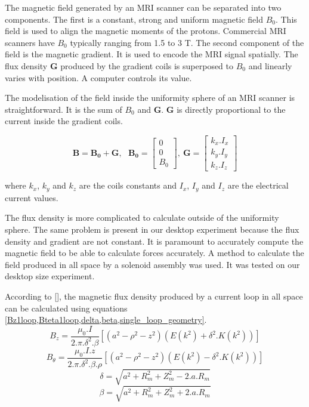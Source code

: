 \documentclass[letterpaper, 10 pt, conference]{ieeeconf}  %
\begin{document}
The magnetic field generated by an MRI scanner can be separated into two components. The first is a constant, strong and uniform magnetic field $B_0$. This field is used to align the magnetic moments of the protons. Commercial MRI scanners have $B_0$ typically ranging from 1.5 to 3 T. The second component of the field is the magnetic gradient. It is used to encode the MRI signal spatially. The flux density $\mathbf{G}$ produced by the gradient coils is superposed to $B_0$ and linearly varies with position. A computer controls its value.\par
The modelisation of the field inside the uniformity sphere of an MRI scanner is straightforward. It is the sum of $B_0$ and $\mathbf{G}$. $\mathbf{G}$ is directly proportional to the current inside the gradient coils.

\begin{equation}
\mathbf{B}=\mathbf{B_0}+\mathbf{G},~~~
\mathbf{B_0}=\begin{bmatrix}
0\\ 
0\\ 
B_0
\end{bmatrix},~
\mathbf{G}=\begin{bmatrix}
k_x.I_x\\ 
k_y.I_y\\ 
k_z.I_z
\end{bmatrix}
\end{equation}

where $k_x$, $k_y$ and $k_z$ are the coils constants and $I_x$, $I_y$ and $I_z$ are the electrical current values.\par

The flux density is more complicated to calculate outside of the uniformity sphere. The same problem is present in our desktop experiment because the flux density and gradient are not constant. It is paramount to accurately compute the magnetic field to be able to calculate forces accurately. A method to calculate the field produced in all space by a solenoid assembly was used. It was tested on our desktop size experiment.\par
According to [], the magnetic flux density produced by a current loop in all space can be calculated using equations \cref{Bz1loop,Bteta1loop,delta,beta,single_loop_geometry}.
\begin{equation}
B_z=\frac{\mu _0.I}{2.\pi.\delta ^{2}.\beta  }\left [ \left ( a^2-\rho ^2-z^2 \right )(E(k^2)+\delta ^2.K(k^2)) \right ] 
\label{Bz1loop}
\end{equation}
\begin{equation}
B_\theta=\frac{\mu _0.I.z}{2.\pi.\delta ^{2}.\beta.\rho   }\left [ \left ( a^2-\rho ^2-z^2 \right )(E(k^2)-\delta ^2.K(k^2)) \right ]
\label{Bteta1loop}
\end{equation}
\begin{equation}
\delta =\sqrt{a^2+R_m^2+Z_m^2-2.a.R_m}
\label{delta}
\end{equation}
\begin{equation}
\beta =\sqrt{a^2+R_m^2+Z_m^2+2.a.R_m}
\label{beta}
\end{equation}
\end{document}
